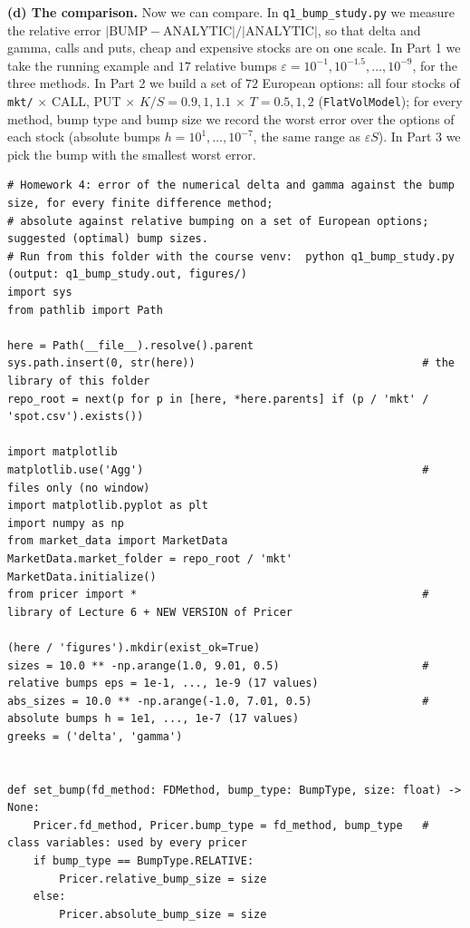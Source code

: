 \documentclass[11pt,a4paper]{article}
\newcommand{\step}[1]{\par\smallskip\noindent\textbf{#1}\enspace\ignorespaces}
\begin{document}
\step{(d) The comparison.} Now we can compare. In \texttt{q1\_bump\_study.py} we measure the relative error $|\text{BUMP}-\text{ANALYTIC}|/|\text{ANALYTIC}|$, so that delta and gamma, calls and puts, cheap and expensive stocks are on one scale. In Part 1 we take the running example and $17$ relative bumps $\varepsilon=10^{-1},10^{-1.5},\dots,10^{-9}$, for the three methods. In Part 2 we build a set of $72$ European options: all four stocks of \texttt{mkt/} $\times$ CALL, PUT $\times$ $K/S=0.9,1,1.1$ $\times$ $T=0.5,1,2$ (\texttt{FlatVolModel}); for every method, bump type and bump size we record the worst error over the options of each stock (absolute bumps $h=10^{1},\dots,10^{-7}$, the same range as $\varepsilon S$). In Part 3 we pick the bump with the smallest worst error.
\begin{lstlisting}[style=pysmall]
# Homework 4: error of the numerical delta and gamma against the bump size, for every finite difference method;
# absolute against relative bumping on a set of European options; suggested (optimal) bump sizes.
# Run from this folder with the course venv:  python q1_bump_study.py   (output: q1_bump_study.out, figures/)
import sys
from pathlib import Path

here = Path(__file__).resolve().parent
sys.path.insert(0, str(here))                                   # the library of this folder
repo_root = next(p for p in [here, *here.parents] if (p / 'mkt' / 'spot.csv').exists())

import matplotlib
matplotlib.use('Agg')                                           # files only (no window)
import matplotlib.pyplot as plt
import numpy as np
from market_data import MarketData
MarketData.market_folder = repo_root / 'mkt'
MarketData.initialize()
from pricer import *                                            # library of Lecture 6 + NEW VERSION of Pricer

(here / 'figures').mkdir(exist_ok=True)
sizes = 10.0 ** -np.arange(1.0, 9.01, 0.5)                      # relative bumps eps = 1e-1, ..., 1e-9 (17 values)
abs_sizes = 10.0 ** -np.arange(-1.0, 7.01, 0.5)                 # absolute bumps h = 1e1, ..., 1e-7 (17 values)
greeks = ('delta', 'gamma')


def set_bump(fd_method: FDMethod, bump_type: BumpType, size: float) -> None:
    Pricer.fd_method, Pricer.bump_type = fd_method, bump_type   # class variables: used by every pricer
    if bump_type == BumpType.RELATIVE:
        Pricer.relative_bump_size = size
    else:
        Pricer.absolute_bump_size = size



\end{lstlisting}
\end{document}
